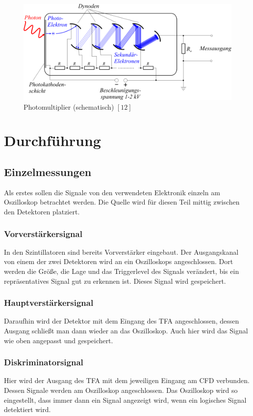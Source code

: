 \documentclass[12pt,a4paper]{scrartcl}
\numberwithin{equation}{section} %
\begin{document}
\begin{figure}[h]
	\centering
	\includegraphics{../media/B3.4/Photomultiplier_schema_de.png}
	\caption{Photomultiplier (schematisch) $[12]$}
	\label{abb:Photomultiplier}
\end{figure}

\clearpage
\hypertarget{durchfuxfchrung}{%
\section{Durchführung}\label{durchfuxfchrung}}

\subsection{Einzelmessungen}
Als erstes sollen die Signale von den verwendeten Elektronik einzeln am Oszilloskop betrachtet werden. Die Quelle wird für diesen Teil mittig zwischen den Detektoren platziert.

\subsubsection{Vorverstärkersignal}
In den Szintillatoren sind bereits Vorverstärker eingebaut. Der Ausgangskanal von einem der zwei Detektoren wird an ein Oszilloskops angeschlossen. Dort werden die Größe, die Lage und das Triggerlevel des Signals verändert, bis ein repräsentatives Signal gut zu erkennen ist. Dieses Signal wird gespeichert.

\subsubsection{Hauptverstärkersignal}
Daraufhin wird der Detektor mit dem Eingang des TFA angeschlossen, dessen Ausgang schließt man dann wieder an das Oszilloskop. Auch hier wird das Signal wie oben angepasst und gespeichert.

\subsubsection{Diskriminatorsignal}
Hier wird der Ausgang des TFA mit dem jeweiligen Eingang am CFD verbunden. Dessen Signale werden am Oszilloskop angeschlossen. Das Oszilloskop wird so eingestellt, dass immer dann ein Signal angezeigt wird, wenn ein logisches Signal detektiert wird.
\end{document}
